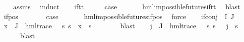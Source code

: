 \begin{isabellebody}
%
\isadelimproof
\ \ %
\endisadelimproof
%
\isatagproof
{}\isamarkupfalse%
\ assms\ \isamarkupfalse%
\ induct\isanewline
\ \ \isamarkupfalse%
\ if{\isacharunderscore}{\kern0pt}tt\isanewline
\ \ \isamarkupfalse%
\ \isamarkupfalse%
\ {\isacharquery}{\kern0pt}case\ \isanewline
\ \ \ \ \isamarkupfalse%
\ hml{\isacharunderscore}{\kern0pt}impossible{\isacharunderscore}{\kern0pt}futures{\isachardot}{\kern0pt}if{\isacharunderscore}{\kern0pt}tt\ \isamarkupfalse%
\ blast\isanewline
{}\isamarkupfalse%
\isanewline
\ \ \isamarkupfalse%
\ {\isacharparenleft}{\kern0pt}if{\isacharunderscore}{\kern0pt}pos\ {\isasymphi}\ {\isasymalpha}{\isacharparenright}{\kern0pt}\isanewline
\ \ \isamarkupfalse%
\ \isamarkupfalse%
\ {\isacharquery}{\kern0pt}case\ \isanewline
\ \ \ \ \isamarkupfalse%
\ hml{\isacharunderscore}{\kern0pt}impossible{\isacharunderscore}{\kern0pt}futures{\isachardot}{\kern0pt}if{\isacharunderscore}{\kern0pt}pos\ \isamarkupfalse%
\ force\isanewline
{}\isamarkupfalse%
\isanewline
\ \ \isamarkupfalse%
\ {\isacharparenleft}{\kern0pt}if{\isacharunderscore}{\kern0pt}conj\ {\isasymPhi}\ I\ J{\isacharparenright}{\kern0pt}\isanewline
\ \ \isamarkupfalse%
\ {\isachardoublequoteopen}{\isasymforall}x\ {\isasymin}\ {\isasymPhi}{\isacharbackquote}{\kern0pt}J{\isachardot}{\kern0pt}\ {\isacharparenleft}{\kern0pt}{\isasymexists}{\isasympsi}{\isachardot}{\kern0pt}\ hml{\isacharunderscore}{\kern0pt}trace\ {\isasympsi}\ {\isasymand}\ {\isacharparenleft}{\kern0pt}{\isasymforall}s{\isachardot}{\kern0pt}\ s\ {\isasymTurnstile}\ x\ {\isasymlongleftrightarrow}\ s\ {\isasymTurnstile}\ {\isasympsi}{\isacharparenright}{\kern0pt}{\isacharparenright}{\kern0pt}{\isachardoublequoteclose}\isanewline
\ \ \ \ \isamarkupfalse%
\ blast\isanewline
\ \ \isamarkupfalse%
\ {\isachardoublequoteopen}{\isasymforall}j\ {\isasymin}\ J{\isachardot}{\kern0pt}\ {\isacharparenleft}{\kern0pt}{\isasymexists}{\isasympsi}{\isachardot}{\kern0pt}\ hml{\isacharunderscore}{\kern0pt}trace\ {\isasympsi}\ {\isasymand}\ {\isacharparenleft}{\kern0pt}{\isasymforall}s{\isachardot}{\kern0pt}\ s\ {\isasymTurnstile}\ {\isasymPhi}\ j\ {\isasymlongleftrightarrow}\ s\ {\isasymTurnstile}\ {\isasympsi}{\isacharparenright}{\kern0pt}{\isacharparenright}{\kern0pt}{\isachardoublequoteclose}\isanewline
\ \ \ \ \isamarkupfalse%
\ blast\isanewline

\end{isabellebody}
